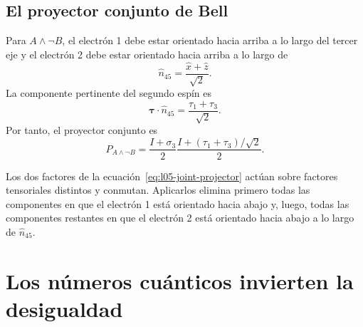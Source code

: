\subsection{El proyector conjunto de Bell}

Para \(A\wedge\neg B\), el electrón 1 debe estar orientado hacia arriba a lo largo del tercer eje y el electrón 2 debe estar orientado hacia arriba a lo largo de
\begin{equation}
  \hat n_{45}=\frac{\hat x+\hat z}{\sqrt2}.
\end{equation}
La componente pertinente del segundo espín es
\begin{equation}
  \boldsymbol{\tau}\cdot\hat n_{45}
  =
  \frac{\tau_1+\tau_3}{\sqrt2}.
\end{equation}
Por tanto, el proyector conjunto es
\begin{equation}
  P_{A\wedge\neg B}
  =
  \frac{I+\sigma_3}{2}
  \frac{I+(\tau_1+\tau_3)/\sqrt2}{2}.
  \label{eq:l05-joint-projector}
\end{equation}

\begin{classroomqa}
\end{classroomqa}

\begin{classroomqa}
\end{classroomqa}

Los dos factores de la ecuación~\eqref{eq:l05-joint-projector} actúan sobre factores tensoriales distintos y conmutan. Aplicarlos elimina primero todas las componentes en que el electrón 1 está orientado hacia abajo y, luego, todas las componentes restantes en que el electrón 2 está orientado hacia abajo a lo largo de \(\hat n_{45}\).

\section{Los números cuánticos invierten la desigualdad}

